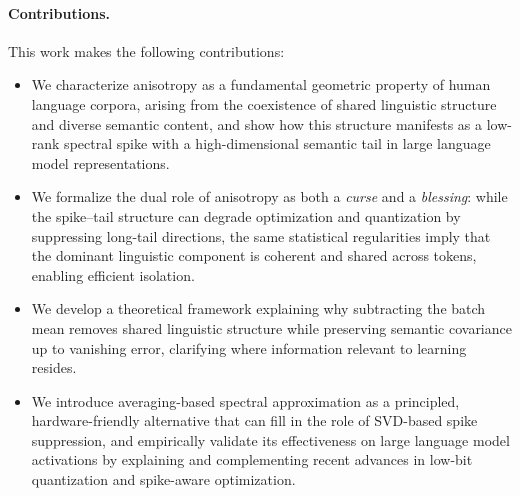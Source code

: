 {\paragraph{Contributions.}
This work makes the following contributions:
\begin{itemize}
    \item We characterize anisotropy as a fundamental geometric property of human
    language corpora, arising from the coexistence of shared linguistic structure and
    diverse semantic content, and show how this structure manifests as a low-rank
    spectral spike with a high-dimensional semantic tail in large language model
    representations.
    \item We formalize the dual role of anisotropy as both a \emph{curse} and a
    \emph{blessing}: while the spike--tail structure can degrade optimization and
    quantization by suppressing long-tail directions, the same statistical
    regularities imply that the dominant linguistic component is coherent and shared
    across tokens, enabling efficient isolation.
    \item We develop a theoretical framework explaining why subtracting the batch mean
    removes shared linguistic structure while preserving semantic covariance up to
    vanishing error, clarifying where information relevant to learning resides.
    \item We introduce averaging-based spectral approximation as a principled,
    hardware-friendly alternative that can fill in the role of SVD-based spike
    suppression, and empirically validate its effectiveness on large language model
    activations by explaining and complementing recent advances in low-bit
    quantization and spike-aware optimization.
\end{itemize}
}